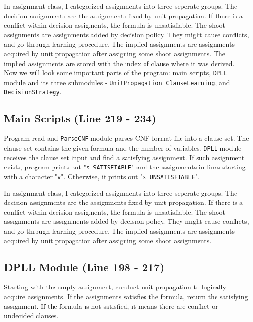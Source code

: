 \documentclass[10pt,a4paper]{article}
\begin{document}
	In assignment class, I categorized assignments into three seperate groups. The decision assignments are the assignments fixed by unit propagation. If there is a conflict within decision assigments, the formula is unsatisfiable. The shoot assignments are assignments added by decision policy. They might cause conflicts, and go through learning procedure. The implied assignments are assignments acquired by unit propagation after assigning some shoot assignments. The implied assignments are stored with the index of clause where it was derived.\\
	
	
	Now we will look some important parts of the program: main scripts, \texttt{DPLL} module and its three submodules - \texttt{UnitPropagation}, \texttt{ClauseLearning}, and \texttt{DecisionStrategy}.
	
	\subsection{Main Scripts {\small (Line 219 - 234)}}
	
	Program read and \texttt{ParseCNF} module parses CNF format file into a clause set. The clause set contains the given formula and the number of variables. \texttt{DPLL} module receives the clause set input and find a satisfying assignment. If such assignment exists, program prints out "\texttt{s SATISFIABLE}" and the assignments in lines starting with a character "\texttt{v}". Otherwise, it prints out "\texttt{s UNSATISFIABLE}".
	
	In assignment class, I categorized assignments into three seperate groups. The decision assignments are the assignments fixed by unit propagation. If there is a conflict within decision assigments, the formula is unsatisfiable. The shoot assignments are assignments added by decision policy. They might cause conflicts, and go through learning procedure. The implied assignments are assignments acquired by unit propagation after assigning some shoot assignments.
	
	
	\subsection{DPLL Module {\small (Line 198 - 217)}}
	
	Starting with the empty assignment, conduct unit propagation to logically acquire assignments. If the assignments satisfies the formula, return the satisfying assignment. If the formula is not satisfied, it means there are conflict or undecided clauses.
	
\end{document}
